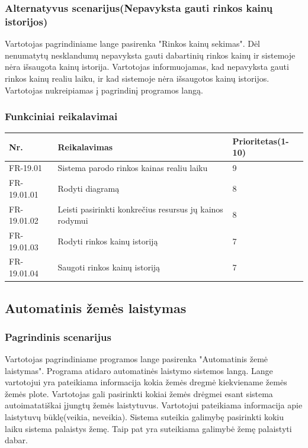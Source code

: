 \documentclass[oneside]{VUMIFPSkursinis}
\begin{document}
	\subsubsection{Alternatyvus scenarijus(Nepavyksta gauti rinkos kainų istorijos)}
	Vartotojas pagrindiniame lange pasirenka "Rinkos kainų sekimas". Dėl nenumatytų nesklandumų nepavyksta gauti dabartinių rinkos kainų ir sistemoje nėra išsaugota kainų istorija. Vartotojas informuojamas, kad nepavyksta gauti rinkos kainų realiu laiku, ir kad sistemoje nėra išsaugotos kainų istorijos. Vartotojas nukreipiamas į pagrindinį programos langą.
	\subsubsection{Funkciniai reikalavimai}
\begin{table}[htbp]
	\begin{tabularx}{1\textwidth}{ |P{2.5cm}|X|P{3cm }| } \hline
		Nr. & Reikalavimas & Prioritetas(1-10) \\ \hline
		FR-19.01 & Sistema parodo rinkos kainas realiu laiku &  9 \\ \hline
		FR-19.01.01 & Rodyti diagramą & 8 \\ \hline
		FR-19.01.02 & Leisti pasirinkti konkrečius resursus jų kainos rodymui & 8 \\ \hline
		FR-19.01.03 & Rodyti rinkos kainų istoriją & 7 \\ \hline
		FR-19.01.04 & Saugoti rinkos kainų istoriją & 7 \\ \hline
	\end{tabularx}
\end{table}
	 
\subsection{Automatinis žemės laistymas}
	\subsubsection{Pagrindinis scenarijus}
	Vartotojas pagrindiniame programos lange pasirenka "Automatinis žemė laistymas". Programa atidaro automatinės laistymo sistemos langą. Lange vartotojui yra pateikiama informacija kokia žemės dregmė kiekviename žemės žemės plote. Vartotojas gali pasirinkti kokiai žemės drėgmei esant sistema autoimatatiškai įjungtų žemės laistytuvus. Vartotojui pateikiama informacija apie laistytuvų būklę(veikia, neveikia). Sistema suteikia galimybę pasirinkti kokiu laiku sistema palaistys žemę. Taip pat yra suteikiama galimybė žemę palaistyti dabar.
\end{document}

